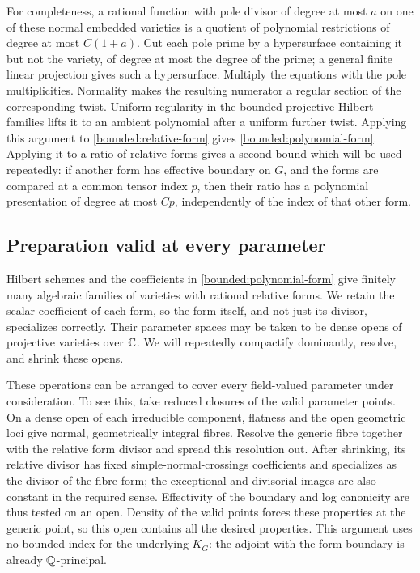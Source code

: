 For completeness, a rational function with pole divisor of degree at
most \(a\) on one of these normal embedded varieties is a quotient of
polynomial restrictions of degree at most \(C(1+a)\).  Cut each pole
prime by a hypersurface containing it but not the variety, of degree at
most the degree of the prime; a general finite linear projection gives
such a hypersurface.  Multiply the equations with the pole
multiplicities.  Normality makes the resulting numerator a regular
section of the corresponding twist.  Uniform regularity in the bounded
projective Hilbert families lifts it to an ambient polynomial after a
uniform further twist.  Applying this argument to \eqref{bounded:relative-form}
gives \eqref{bounded:polynomial-form}.  Applying it to a ratio of relative
forms gives a second bound which will be used repeatedly: if another
form has effective boundary on \(G\), and the forms are compared at a
common tensor index \(p\), then their ratio has a polynomial presentation
of degree at most \(Cp\), independently of the index of that other form.

\subsection{Preparation valid at every parameter}

Hilbert schemes and the coefficients in \eqref{bounded:polynomial-form}
give finitely many algebraic families of varieties with rational
relative forms.  We retain the scalar coefficient of each form, so the
form itself, and not just its divisor, specializes correctly.  Their
parameter spaces may be taken to be dense opens of projective varieties
over \(\mathbb C\).  We will repeatedly compactify dominantly, resolve, and
shrink these opens.

These operations can be arranged to cover every field-valued parameter
under consideration.  To see this, take reduced closures of the valid
parameter points.  On a dense open of each irreducible component,
flatness and the open geometric loci give normal, geometrically integral
fibres.  Resolve the generic fibre together with the relative form
divisor and spread this resolution out.  After shrinking, its relative
divisor has fixed simple-normal-crossings coefficients and specializes
as the divisor of the fibre form; the exceptional and divisorial images
are also constant in the required sense.  Effectivity of the boundary
and log canonicity are thus tested on an open.  Density of the valid
points forces these properties at the generic point, so this open
contains all the desired properties.  This argument uses no bounded
index for the underlying \(K_G\): the adjoint with the form boundary is
already \(\mathbb Q\)-principal.


